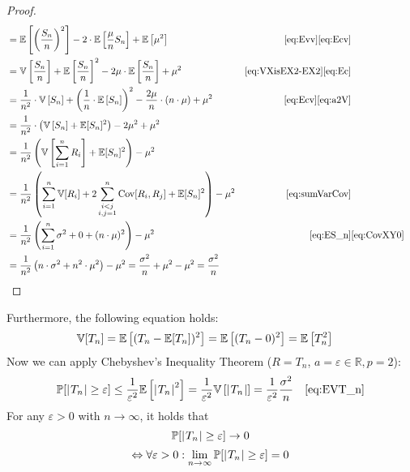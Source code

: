 \begin{proof}
\begin{align}
              &= \mathbb E\left[\left(\frac{S_n}{n}\right)^2\right] - 2\cdot\mathbb E\left[\frac{\mu}{n} S_n\right] + \mathbb E\left[\mu^2\right] & \eqref{eq:Evv}\eqref{eq:Ecv} \notag\\
              &= \mathbb V\left[\frac{S_n}{n}\right] + \mathbb E\left[\frac{S_n}{n}\right]^2 - 2\mu \cdot \mathbb E\left[\frac{S_n}{n}\right] + \mu^2 & \eqref{eq:VXisEX2-EX2}\eqref{eq:Ec} \notag \\
              &= \frac1{n^2} \cdot \mathbb V\left[S_n\right] + \left(\frac1{n} \cdot \mathbb E\left[S_n\right]\right)^2 - \frac{2\mu}{n} \cdot (n \cdot \mu) + \mu^2 & \eqref{eq:Ecv}\eqref{eq:a2V} \notag \\
              &= \frac1{n^2} \cdot \left(\mathbb V\left[S_n\right] + \mathbb E[S_n]^2\right) - 2\mu^2 + \mu^2 \notag \\
              &= \frac{1}{n^2} \left(\mathbb V\left[\sum_{i=1}^n R_i\right] + \mathbb E[S_n]^2\right) - \mu^2 \notag\\
              &= \frac{1}{n^2} \left(\sum_{i=1}^n \mathbb V[R_i] + 2\sum_{\substack{i<j \\ i,j=1}}^n \operatorname{Cov}[R_i,R_j] + \mathbb E[S_n]^2\right) - \mu^2 & \eqref{eq:sumVarCov} \notag\\
              &= \frac{1}{n^2} \left(\sum_{i=1}^n \sigma^2 + 0 + (n \cdot \mu)^2\right) - \mu^2 & \eqref{eq:ES_n} & \eqref{eq:CovXY0} \notag\\
              &= \frac{1}{n^2} \left(n \cdot \sigma^2 + n^2 \cdot \mu^2\right) - \mu^2 = \frac{\sigma^2}{n} + \mu^2 - \mu^2 = \frac{\sigma^2}{n}
  \end{align}
\end{proof}
%

Furthermore, the following equation holds:
\begin{align}
    \mathbb V[T_n] &= \mathbb E\left[(T_n - \mathbb E[T_n])^2\right] = \mathbb E\left[(T_n - 0)^2\right] = \mathbb E\left[T_n^2\right] \label{eq:EVT_n}
\end{align}
%
Now we can apply Chebyshev's Inequality Theorem ($R = T_n$, $a = \varepsilon \in \mathbb R, p = 2$):
\begin{align}
  \mathbb P[\left|\hspace{0.6999pt}T_n\hspace{0.6999pt}\right| \geq \varepsilon]
    &\leq \frac{1}{\varepsilon^2} \mathbb E\left[\left|\hspace{0.6999pt}T_n\hspace{0.6999pt}\right|^2\right]
    = \frac{1}{\varepsilon^2} \mathbb V\left[\left|\hspace{0.6999pt}T_n\hspace{0.6999pt}\right|\right]
    = \frac{1}{\varepsilon^2} \frac{\sigma^2}{n}
    & \eqref{eq:EVT_n} \label{eq:cheby-applied}
\end{align}
For any $\varepsilon > 0$ with $n \to \infty$, it holds that
\[ \mathbb P[\left|\hspace{0.6999pt}T_n\hspace{0.6999pt}\right| \geq \varepsilon] \to 0 \]
\[
    \Leftrightarrow \forall \varepsilon > 0:
    \lim_{n\to\infty} \mathbb P[\left|\hspace{0.6999pt}T_n\hspace{0.6999pt}\right| \geq \varepsilon] = 0
\]

